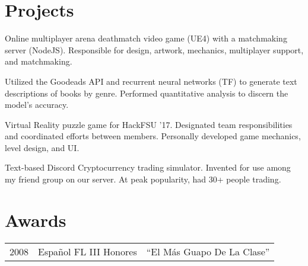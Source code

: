 \documentclass[]{deedy_resume}
\begin{document}
\begin{minipage}[t]{0.63\textwidth}

\section{Projects}
Online multiplayer arena deathmatch video game (UE4) with a matchmaking server (NodeJS). Responsible for design, artwork, mechanics, multiplayer support, and matchmaking.
\sectionsep

Utilized the Goodeads API and recurrent neural networks (TF) to generate text descriptions of books by genre. Performed quantitative analysis to discern the model's accuracy.
\sectionsep

Virtual Reality puzzle game for HackFSU '17. Designated team responsibilities and coordinated efforts between members. Personally developed game mechanics, level design, and  UI.
\sectionsep

Text-based Discord Cryptocurrency trading simulator. Invented for use among my friend group on our server. At peak popularity, had 30+ people trading.
\sectionsep


\section{Awards} 
\begin{tabular}{rll}
2008	 & Espa\~nol FL III Honores  & ``El M\'as Guapo De La Clase'' \\
\end{tabular}
\sectionsep


\begin{comment}
\section{Publications} 
\renewcommand\refname{\vskip -1.5cm} %


\nocite{*}
\end{comment}

\end{minipage} 
\end{document}
